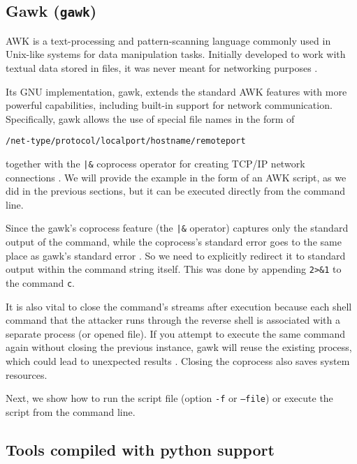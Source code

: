 \subsection{Gawk (\texttt{gawk})}


AWK is a text-processing and pattern-scanning language commonly used in Unix-like systems for data manipulation tasks. Initially developed to work with textual data stored in files, it was never meant for networking purposes \cite{gawk-doc}.

Its GNU implementation, gawk, extends the standard AWK features with more powerful capabilities, including built-in support for network communication. Specifically, gawk allows the use of special file names in the form of

\qquad \texttt{/net-type/protocol/localport/hostname/remoteport}

together with the \texttt{|\&} coprocess operator for creating TCP/IP network connections \cite{gawk-man}. We will provide the example in the form of an AWK script, as we did in the previous sections, but it can be executed directly from the command line.


Since the gawk's coprocess feature (the \texttt{|\&} operator) captures only the standard output of the command, while the coprocess's standard error goes to the same place as gawk's standard error \cite{gawk-io}. So we need to explicitly redirect it to standard output within the command string itself. This was done by appending \texttt{2>\&1} to the command \texttt{c}.

It is also vital to close the command's streams after execution because each shell command that the attacker runs through the reverse shell is associated with a separate process (or opened file). If you attempt to execute the same command again without closing the previous instance, gawk will reuse the existing process, which could lead to unexpected results \cite{gawk-close}. Closing the coprocess also saves system resources.

Next, we show how to run the script file (option \texttt{-f} or \texttt{--file}) or execute the script from the command line.



\subsection{Tools compiled with python support}

